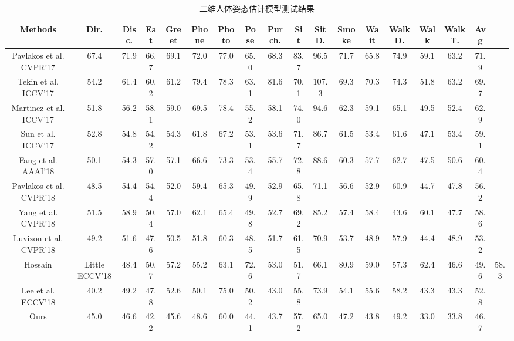 \begin{table}[h]
    \caption{\label{tab:t3}二维人体姿态估计模型测试结果}
    \centering
    \begin{tabular}{c c c c c c c c c c c c c c c c c c}
        \toprule
		Methods  & Dir.   & Disc. & Eat   & Greet  & Phone  & Photo  & Pose  & Purch.  & Sit  & SitD.  & Smoke  & Wait  & WalkD.  & Walk  & WalkT.  & Avg   \\
        \midrule
        Pavlakos et al. CVPR’17     & 67.4  & 71.9  & 66.7  & 69.1  & 72.0  & 77.0  & 65.0  & 68.3  & 83.7  & 96.5  & 71.7  & 65.8  & 74.9  & 59.1  & 63.2  & 71.9  \\
		Tekin et al. ICCV’17        & 54.2  & 61.4  & 60.2  & 61.2  & 79.4  & 78.3  & 63.1  & 81.6  & 70.1  & 107.3 & 69.3  & 70.3  & 74.3  & 51.8  & 63.2  & 69.7  \\
		Martinez et al. ICCV’17     & 51.8  & 56.2  & 58.1  & 59.0  & 69.5  & 78.4  & 55.2  & 58.1  & 74.0  & 94.6  & 62.3  & 59.1  & 65.1  & 49.5  & 52.4  & 62.9  \\
		Sun et al. ICCV’17          & 52.8  & 54.8  & 54.2  & 54.3  & 61.8  & 67.2  & 53.1  & 53.6  & 71.7  & 86.7  & 61.5  & 53.4  & 61.6  & 47.1  & 53.4  & 59.1  \\
		Fang et al. AAAI’18         & 50.1  & 54.3  & 57.0  & 57.1  & 66.6  & 73.3  & 53.4  & 55.7  & 72.8  & 88.6  & 60.3  & 57.7  & 62.7  & 47.5  & 50.6  & 60.4  \\
		Pavlakos et al. CVPR’18     & 48.5  & 54.4  & 54.4  & 52.0  & 59.4  & 65.3  & 49.9  & 52.9  & 65.8  & 71.1  & 56.6  & 52.9  & 60.9  & 44.7  & 47.8  & 56.2  \\
		Yang et al. CVPR’18         & 51.5  & 58.9  & 50.4  & 57.0  & 62.1  & 65.4  & 49.8  & 52.7  & 69.2  & 85.2  & 57.4  & 58.4  & 43.6  & 60.1  & 47.7  & 58.6  \\
		Luvizon et al. CVPR’18      & 49.2  & 51.6  & 47.6  & 50.5  & 51.8  & 60.3  & 48.5  & 51.7  & 61.5  & 70.9  & 53.7  & 48.9  & 57.9  & 44.4  & 48.9  & 53.2  \\
		Hossain & Little ECCV’18    & 48.4  & 50.7  & 57.2  & 55.2  & 63.1  & 72.6  & 53.0  & 51.7  & 66.1  & 80.9  & 59.0  & 57.3  & 62.4  & 46.6  & 49.6  & 58.3  \\
		Lee et al. ECCV’18          & 40.2  & 49.2  & 47.8  & 52.6  & 50.1  & 75.0  & 50.2  & 43.0  & 55.8  & 73.9  & 54.1  & 55.6  & 58.2  & 43.3  & 43.3  & 52.8  \\
        \bottomrule
		Ours                        & 45.0  & 46.6  & 42.2	& 45.6  & 48.6  & 60.0  & 44.1  & 43.7  & 57.2  & 65.0  & 47.2	& 43.8  & 49.2  & 33.0	& 33.8	& 46.7  \\
    \end{tabular}
\end{table}












